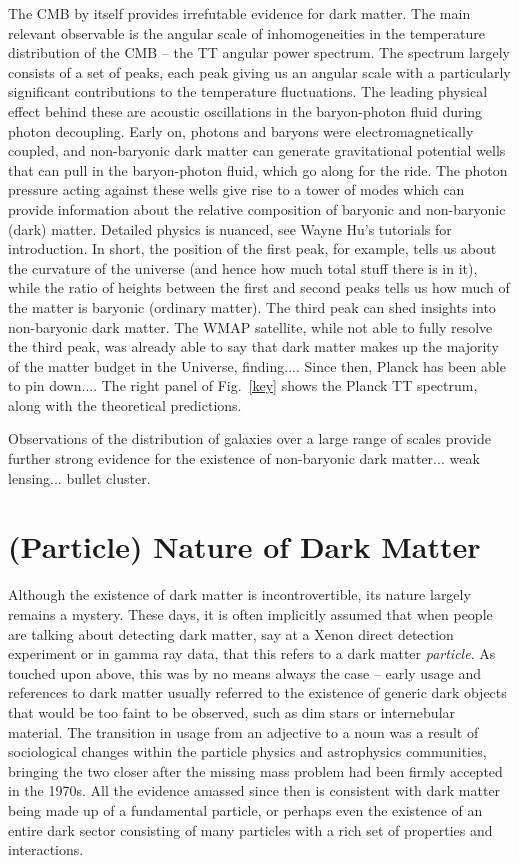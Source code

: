 The CMB by itself provides irrefutable evidence for dark matter. The main relevant observable is the angular scale of inhomogeneities in the temperature distribution of the CMB -- the TT angular power spectrum. The spectrum largely consists of a set of peaks, each peak giving us an angular scale with a particularly significant contributions to the temperature fluctuations. The leading physical effect behind these are acoustic oscillations in the baryon-photon fluid during photon decoupling. Early on, photons and baryons were electromagnetically coupled, and non-baryonic dark matter can generate gravitational potential wells that can pull in the baryon-photon fluid, which go along for the ride. The photon pressure acting against these wells give rise to a tower of modes which can provide information about the relative composition of baryonic and non-baryonic (dark) matter. Detailed physics is nuanced, see Wayne Hu's tutorials for introduction. In short, the position of the first peak, for example, tells us about the curvature of the universe (and hence how much total stuff there is in it), while the ratio of heights between the first and second peaks tells us how much of the matter is baryonic (ordinary matter). The third peak can shed insights into non-baryonic dark matter. The WMAP satellite, while not able to fully resolve the third peak, was already able to say that dark matter makes up the majority of the matter budget in the Universe, finding.... Since then, Planck has been able to pin down.... The right panel of Fig.~\ref{key} shows the Planck TT spectrum, along with the theoretical predictions.

Observations of the distribution of galaxies over a large range of scales provide further strong evidence for the existence of non-baryonic dark matter... weak lensing... bullet cluster.

\section{(Particle) Nature of Dark Matter}
\label{sec:particledm}

Although the existence of dark matter is incontrovertible, its nature largely remains a mystery. These days, it is often implicitly assumed that when people are talking about detecting dark matter, say at a Xenon direct detection experiment or in gamma ray data, that this refers to a dark matter \emph{particle}. As touched upon above, this was by no means always the case -- early usage and references to dark matter usually referred to the existence of generic dark objects that would be too faint to be observed, such as dim stars or internebular material. The transition in usage from an adjective to a noun was a result of sociological changes within the particle physics and astrophysics communities, bringing the two closer after the missing mass problem had been firmly accepted in the 1970s. All the evidence amassed since then is consistent with dark matter being made up of a fundamental particle, or perhaps even the existence of an entire dark sector consisting of many particles with a rich set of properties and interactions.


